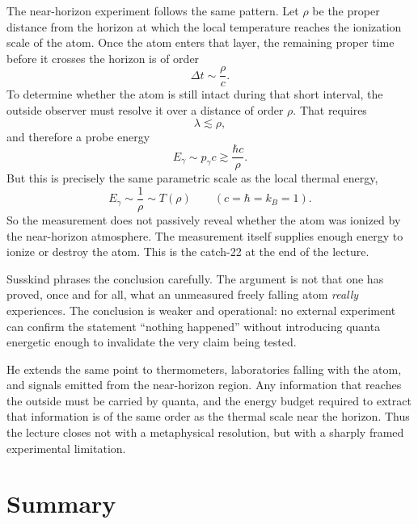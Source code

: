 The near-horizon experiment follows the same pattern. Let \(\rho\) be the proper distance from the horizon at which the local temperature reaches the ionization scale of the atom. Once the atom enters that layer, the remaining proper time before it crosses the horizon is of order
\begin{equation}
\Delta t \sim \frac{\rho}{c}.
\end{equation}
To determine whether the atom is still intact during that short interval, the outside observer must resolve it over a distance of order \(\rho\). That requires
\begin{equation}
\lambda \lesssim \rho,
\end{equation}
and therefore a probe energy
\begin{equation}
E_\gamma \sim p_\gamma c \gtrsim \frac{\hbar c}{\rho}.
\end{equation}
But this is precisely the same parametric scale as the local thermal energy,
\begin{equation}
E_\gamma \sim \frac{1}{\rho} \sim T(\rho)
\qquad
(c=\hbar=k_B=1).
\end{equation}
So the measurement does not passively reveal whether the atom was ionized by the near-horizon atmosphere. The measurement itself supplies enough energy to ionize or destroy the atom. This is the catch-22 at the end of the lecture.

\begin{remark}
Susskind phrases the conclusion carefully. The argument is not that one has proved, once and for all, what an unmeasured freely falling atom \emph{really} experiences. The conclusion is weaker and operational: no external experiment can confirm the statement ``nothing happened'' without introducing quanta energetic enough to invalidate the very claim being tested.
\end{remark}

He extends the same point to thermometers, laboratories falling with the atom, and signals emitted from the near-horizon region. Any information that reaches the outside must be carried by quanta, and the energy budget required to extract that information is of the same order as the thermal scale near the horizon. Thus the lecture closes not with a metaphysical resolution, but with a sharply framed experimental limitation.

\section{Summary}

